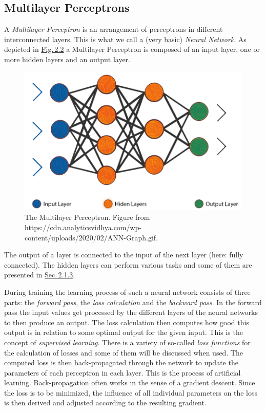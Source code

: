 \subsection{Multilayer Perceptrons} \label{sec:2.1.2}
A \textit{Multilayer Perceptron} is an arrangement of perceptrons in different interconnected layers. This is what we call a (very basic) \textit{Neural Network}. As depicted in \hyperref[fig:2.2]{Fig.\,2.2} a Multilayer Perceptron is composed of an input layer, one or more hidden layers and an output layer. 
%
\begin{figure} \label{fig:2.2}
    \centering
    \includegraphics[width=.5\textwidth]{Chapters/figures/multilayer_perceptron.PNG}
    \caption[The Multilayer Perceptron]{The Multilayer Perceptron. Figure from\\ https://cdn.analyticsvidhya.com/wp-content/uploads/2020/02/ANN-Graph.gif.}
\end{figure}
%
The output of a layer is connected to the input of the next layer (here: fully connected). The hidden layers can perform various tasks and some of them are presented in \hyperref[sec:2.1.3]{Sec.\,2.1.3}.

During training the learning process of such a neural network consists of three parts: the \textit{forward pass}, the \textit{loss calculation} and the \textit{backward pass}. In the forward pass the input values get processed by the different layers of the neural networks to then produce an output. The loss calculation then computes how good this output is in relation to some optimal output for the given input. This is the concept of \textit{supervised learning}. There is a variety of so-called \textit{loss functions} for the calculation of losses and some of them will be discussed when used. The computed loss is then back-propagated through the network to update the parameters of each perceptron in each layer. This is the process of artificial learning. Back-propagation often works in the sense of a gradient descent. Since the loss is to be minimized, the influence of all individual parameters on the loss is then derived and adjusted according to the resulting gradient. 

